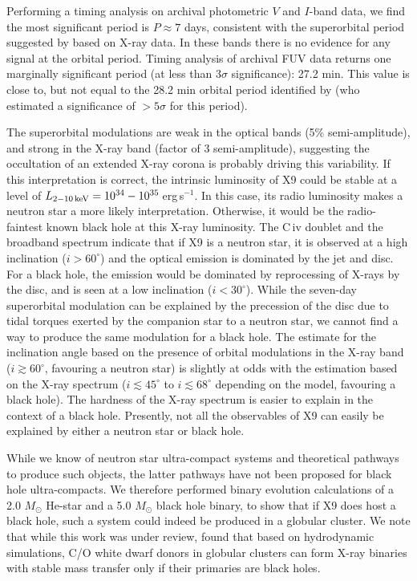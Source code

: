 \documentclass[a4paper,fleqn,usenatbib]{mnras}
\begin{document}
Performing a timing analysis on archival photometric $V$ and $I$-band data, we find the most significant period is $P \approx 7$ days, consistent with the superorbital period suggested by \citet{2017MNRAS.467.2199B} based on X-ray data. In these bands there is no evidence for any signal at the orbital period. Timing analysis of archival FUV data returns one marginally significant period (at less than $3\sigma$ significance): 27.2 min. This value is close to, but not equal to the 28.2 min orbital period identified by \citet{2017MNRAS.467.2199B} (who estimated a significance of $> 5\sigma$ for this period). 

The superorbital modulations are weak in the optical bands (5\% semi-amplitude), and strong in the X-ray band (factor of 3 semi-amplitude), suggesting the occultation of an extended X-ray corona is probably driving this variability. If this interpretation is correct, the intrinsic luminosity of X9 could be stable at a level of $L_{\rm 2-10\,keV} = 10^{34}-10^{35}$\,erg\,s$^{-1}$. In this case, its radio luminosity makes a neutron star a more likely interpretation. Otherwise, it would be the radio-faintest known black hole at this X-ray luminosity. The C\,{\sc iv} doublet and the broadband spectrum indicate that if X9 is a neutron star, it is observed at a high inclination ($i > 60^\circ$) and the optical emission is dominated by the jet and disc. For a black hole, the emission would be dominated by reprocessing of X-rays by the disc, and is seen at a low inclination ($i < 30^\circ$). While the seven-day superorbital modulation can be explained by the precession of the disc due to tidal torques exerted by the companion star to a neutron star, we cannot find a way to produce the same modulation for a black hole. The estimate for the inclination angle based on the presence of orbital modulations in the X-ray band ($i \gtrsim 60^\circ$, favouring a neutron star) is slightly at odds with the estimation based on the X-ray spectrum ($i \lesssim 45^\circ$ to $i \lesssim 68^\circ$ depending on the model, favouring a black hole). The hardness of the X-ray spectrum is easier to explain in the context of a black hole. Presently, not all the observables of X9 can easily be explained by either a neutron star or black hole. 

While we know of neutron star ultra-compact systems and theoretical pathways to produce such objects, the latter pathways have not been proposed for black hole ultra-compacts. We therefore performed binary evolution calculations of a 2.0 $M_\odot$ He-star and a 5.0 $M_\odot$ black hole binary, to show that if X9 does host a black hole, such a system could indeed be produced in a globular cluster. We note that while this work was under review, \citet{2017ApJ...851L...4C} found that based on hydrodynamic simulations, C/O white dwarf donors in globular clusters can form X-ray binaries with stable mass transfer only if their primaries are black holes.
\end{document}
